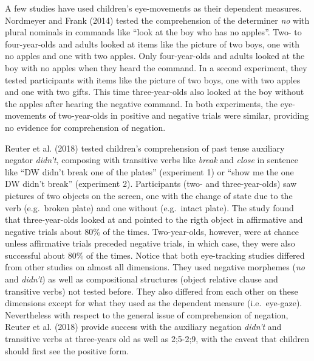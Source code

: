 \documentclass[man,floatsintext]{apa6}
\begin{document}
A few studies have used children's eye-movements as their dependent measures. Nordmeyer and Frank (2014) tested the comprehension of the determiner \emph{no} with plural nominals in commands like \enquote{look at the boy who has no apples}. Two- to four-year-olds and adults looked at items like the picture of two boys, one with no apples and one with two apples. Only four-year-olds and adults looked at the boy with no apples when they heard the command. In a second experiment, they tested participants with items like the picture of two boys, one with two apples and one with two gifts. This time three-year-olds also looked at the boy without the apples after hearing the negative command. In both experiments, the eye-movements of two-year-olds in positive and negative trials were similar, providing no evidence for comprehension of negation.

Reuter et al. (2018) tested children's comprehension of past tense auxiliary negator \emph{didn't}, composing with transitive verbs like \emph{break} and \emph{close} in sentence like \enquote{DW didn't break one of the plates} (experiment 1) or \enquote{show me the one DW didn't break} (experiment 2). Participants (two- and three-year-olds) saw pictures of two objects on the screen, one with the change of state due to the verb (e.g.~broken plate) and one without (e.g.~intact plate). The study found that three-year-olds looked at and pointed to the rigth object in affirmative and negative trials about 80\% of the times. Two-year-olds, however, were at chance unless affirmative trials preceded negative trials, in which case, they were also successful about 80\% of the times. Notice that both eye-tracking studies differed from other studies on almost all dimensions. They used negative morphemes (\emph{no} and \emph{didn't}) as well as compositional structures (object relative clause and transitive verbs) not tested before. They also differed from each other on these dimensions except for what they used as the dependent measure (i.e.~eye-gaze). Nevertheless with respect to the general issue of comprehension of negation, Reuter et al. (2018) provide success with the auxiliary negation \emph{didn't} and transitive verbs at three-years old as well as 2;5-2;9, with the caveat that children should first see the positive form.
\end{document}
